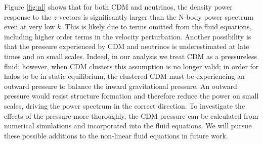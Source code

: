 \documentclass{aastex}
\begin{document}
Figure \ref{fig:nl} shows that for both CDM and 
neutrinos, the density power response to the $z$-vectors is
significantly larger than the N-body power spectrum even at very low
$k$.  This is likely due to terms omitted from the fluid equations,
including higher order terms in the velocity perturbation.
Another possibility is that the pressure experienced by CDM
and neutrinos is underestimated at late times and on small
scales.  Indeed, in our analysis we treat CDM as a
pressureless fluid; however, when CDM clusters this
assumption is no longer valid; in order for halos to be in static
equilibrium, the clustered CDM must be experiencing an outward
pressure to balance the inward gravitational pressure.  An outward
pressure would resist structure formation and therefore reduce the
power on small scales, driving the power spectrum in the correct direction.
To investigate the effects of the pressure more
thoroughly, the CDM pressure can be
calculated from numerical simulations and incorporated into the fluid equations.
We will pursue these possible additions to the non-linear fluid equations in future work.


\end{document}
